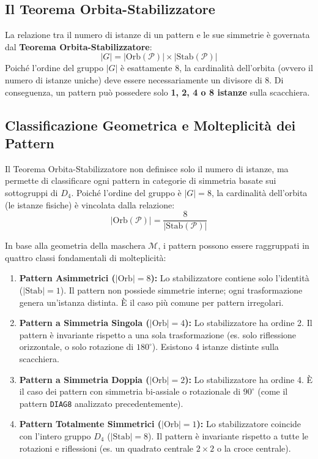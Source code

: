 \subsection{Il Teorema Orbita-Stabilizzatore}
La relazione tra il numero di istanze di un pattern e le sue simmetrie è governata dal \textbf{Teorema Orbita-Stabilizzatore}:
\begin{equation}
    |G| = |\text{Orb}(\mathcal{P})| \times |\text{Stab}(\mathcal{P})|
\end{equation}
Poiché l'ordine del gruppo $|G|$ è esattamente 8, la cardinalità dell'orbita (ovvero il numero di istanze uniche) deve essere necessariamente un divisore di 8. Di conseguenza, un pattern può possedere solo \textbf{1, 2, 4 o 8 istanze} sulla scacchiera.

\subsection{Classificazione Geometrica e Molteplicità dei Pattern}

Il Teorema Orbita-Stabilizzatore non definisce solo il numero di istanze, ma permette di classificare ogni pattern in categorie di simmetria basate sui sottogruppi di $D_4$. Poiché l'ordine del gruppo è $|G|=8$, la cardinalità dell'orbita (le istanze fisiche) è vincolata dalla relazione:
\begin{equation}
    |\text{Orb}(\mathcal{P})| = \frac{8}{|\text{Stab}(\mathcal{P})|}
\end{equation}

In base alla geometria della maschera $\mathcal{M}$, i pattern possono essere raggruppati in quattro classi fondamentali di molteplicità:

\begin{enumerate}
    \item \textbf{Pattern Asimmetrici ($|\text{Orb}|=8$):} Lo stabilizzatore contiene solo l'identità ($|\text{Stab}|=1$). Il pattern non possiede simmetrie interne; ogni trasformazione genera un'istanza distinta. È il caso più comune per pattern irregolari.
    
    \item \textbf{Pattern a Simmetria Singola ($|\text{Orb}|=4$):} Lo stabilizzatore ha ordine 2. Il pattern è invariante rispetto a una sola trasformazione (es. solo riflessione orizzontale, o solo rotazione di $180^\circ$). Esistono 4 istanze distinte sulla scacchiera.
    
    \item \textbf{Pattern a Simmetria Doppia ($|\text{Orb}|=2$):} Lo stabilizzatore ha ordine 4. È il caso dei pattern con simmetria bi-assiale o rotazionale di $90^\circ$ (come il pattern \texttt{DIAG8} analizzato precedentemente).
    
    \item \textbf{Pattern Totalmente Simmetrici ($|\text{Orb}|=1$):} Lo stabilizzatore coincide con l'intero gruppo $D_4$ ($|\text{Stab}|=8$). Il pattern è invariante rispetto a tutte le rotazioni e riflessioni (es. un quadrato centrale $2\times2$ o la croce centrale).
\end{enumerate}

